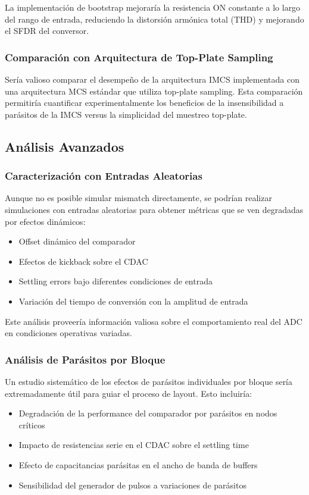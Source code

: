 \documentclass[12pt,a4paper]{report}
\begin{document}
La implementación de bootstrap mejoraría la resistencia ON constante a lo largo del rango de entrada, reduciendo la distorsión armónica total (THD) y mejorando el SFDR del conversor.

\subsubsection{Comparación con Arquitectura de Top-Plate Sampling}

Sería valioso comparar el desempeño de la arquitectura IMCS implementada con una arquitectura MCS estándar que utiliza top-plate sampling. Esta comparación permitiría cuantificar experimentalmente los beneficios de la insensibilidad a parásitos de la IMCS versus la simplicidad del muestreo top-plate.

\subsection{Análisis Avanzados}

\subsubsection{Caracterización con Entradas Aleatorias}

Aunque no es posible simular mismatch directamente, se podrían realizar simulaciones con entradas aleatorias para obtener métricas que se ven degradadas por efectos dinámicos:
\begin{itemize}
    \item Offset dinámico del comparador
    \item Efectos de kickback sobre el CDAC
    \item Settling errors bajo diferentes condiciones de entrada
    \item Variación del tiempo de conversión con la amplitud de entrada
\end{itemize}

Este análisis proveería información valiosa sobre el comportamiento real del ADC en condiciones operativas variadas.

\subsubsection{Análisis de Parásitos por Bloque}

Un estudio sistemático de los efectos de parásitos individuales por bloque sería extremadamente útil para guiar el proceso de layout. Esto incluiría:
\begin{itemize}
    \item Degradación de la performance del comparador por parásitos en nodos críticos
    \item Impacto de resistencias serie en el CDAC sobre el settling time
    \item Efecto de capacitancias parásitas en el ancho de banda de buffers
    \item Sensibilidad del generador de pulsos a variaciones de parásitos
\end{itemize}
\end{document}

